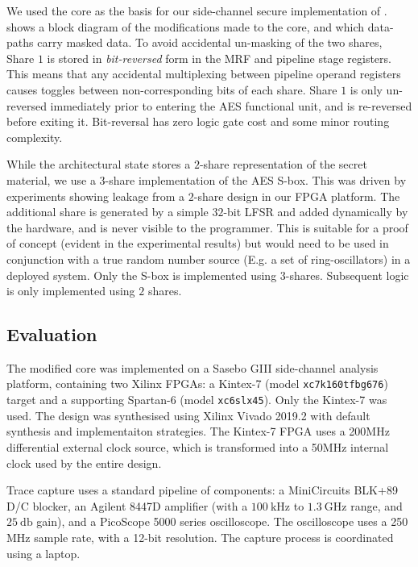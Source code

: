 We used the  core as the basis for our side-channel secure
implementation of .
 shows a block diagram of the modifications
made to the core, and which data-paths carry masked data.
To avoid accidental un-masking of the two shares,
Share $1$ is stored in {\em bit-reversed} form in the MRF and pipeline
stage registers.
This means that any accidental multiplexing between pipeline operand
registers causes toggles between non-corresponding bits of each share.
Share $1$ is only un-reversed immediately prior to entering the
AES functional unit, and is re-reversed before exiting it.
Bit-reversal has zero logic gate cost and some minor routing complexity.

While the architectural state stores a $2$-share representation
of the secret material, we use a $3$-share implementation of the
AES S-box.
This was driven by experiments showing 
leakage from a $2$-share design in our FPGA platform.
The additional share is generated by a simple $32$-bit LFSR and added
dynamically by the hardware, and is never visible to the programmer.
This is suitable for a proof of concept (evident in the experimental
results) but would need to be used in conjunction with a true random
number source (E.g. a set of ring-oscillators) in a deployed system.
Only the S-box is implemented using $3$-shares.
Subsequent  logic is only implemented using $2$ shares.

\subsection{Evaluation}

The modified  core was implemented on a
Sasebo GIII \cite{HKSS:12}
side-channel analysis platform, containing two Xilinx FPGAs:
a Kintex-7 
(model {\tt xc7k160tfbg676})
target
and
a supporting Spartan-6
(model {\tt xc6slx45}).
Only the Kintex-7 was used.
The design was synthesised using Xilinx Vivado 2019.2 with
default synthesis and implementaiton strategies.
The Kintex-7 FPGA uses a 200MHz differential external clock source, which is
transformed into a 50MHz internal clock used by the entire
design.

Trace capture uses a standard pipeline of components:
a MiniCircuits BLK+89 D/C blocker,
an Agilent 8447D amplifier (with a $\SI{100}{\kilo\hertz}$ to $\SI{1.3}{\giga\hertz}$ range, and $\SI{25}{\decibel}$ gain),
and
a  PicoScope 5000 series oscilloscope.
The oscilloscope uses a 250 MHz sample rate, with a 12-bit resolution.
The capture process is coordinated using a laptop.

